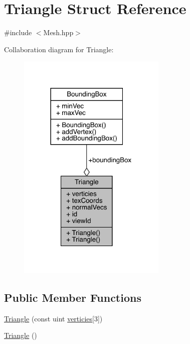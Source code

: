 \hypertarget{struct_triangle}{}\section{Triangle Struct Reference}
\label{struct_triangle}


{\ttfamily \#include $<$Mesh.\+hpp$>$}



Collaboration diagram for Triangle\+:\nopagebreak
\begin{figure}[H]
\begin{center}
\leavevmode
\includegraphics[width=201pt]{struct_triangle__coll__graph}
\end{center}
\end{figure}
\subsection*{Public Member Functions}
\begin{DoxyCompactItemize}
\item 
\hyperlink{struct_triangle_a88209808e641989a51c9f5e23b8857f5}{Triangle} (const uint \hyperlink{struct_triangle_ae6371f947daaa0debff04c10b6fadf74}{verticies}\mbox{[}3\mbox{]})
\item 
\hyperlink{struct_triangle_aaefe4ed500c07918d30c6f0e286332c5}{Triangle} ()
\end{DoxyCompactItemize}
